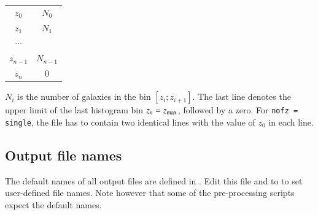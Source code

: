 \documentclass[11pt, chapterprefix, headsepline]{scrartcl}
\begin{document}
\begin{appendix}
\medskip

\begin{tabular}{cc}
  $z_0$ \quad & $N_0$ \\
  $z_1$ & $N_1$ \\
  $\cdots$ \\
  $z_{n-1}$ & $N_{n-1}$ \\
  $z_n$ & $0$ \\
\end{tabular}

$N_i$ is the number of galaxies in the bin $[z_i; z_{i+1}]$.  The last
line denotes the upper limit of the last histogram bin $z_n = z_{\rm
  max}$, followed by a zero.
For \texttt{nofz = single}, the file has
to contain two identical lines with the value of $z_0$ in each line.




\subsection{Output file names}

The default names of all output files are defined in
. Edit this file and to  to
set user-defined file names. Note however that some of the
pre-processing scripts expect the default names.




\end{appendix}
\end{document}
